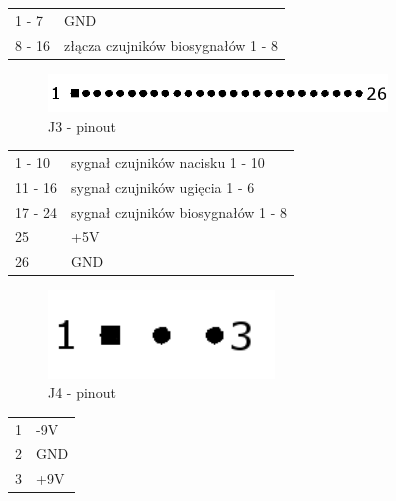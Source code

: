\documentclass{article}
\begin{document}
\begin{table}[H]
	\centering
	\label{J2 - pinout}
	\begin{tabular}{ll}
	1 - 7		&	GND					\\
	8 - 16		&	złącza czujników biosygnałów 1 - 8	\\
\end{tabular}
\end{table}

\begin{figure}[H]
	\centering
	\includegraphics[width=9cm]{J3.png}
	\caption{J3 - pinout}
	\label{rys:J3 - pinout}
\end{figure}

\begin{table}[H]
	\centering
	\label{J3 - pinout}
	\begin{tabular}{ll}
	1 - 10		&	sygnał czujników nacisku 1 - 10		\\
	11 - 16		&	sygnał czujników ugięcia 1 - 6		\\
	17 - 24		&	sygnał czujników biosygnałów 1 - 8	\\
	25		&	+5V					\\
	26		&	GND					\\
\end{tabular}
\end{table}

\begin{figure}[H]
	\centering
	\includegraphics[width=6cm]{J4.png}
	\caption{J4 - pinout}
	\label{rys:J4 - pinout}
\end{figure}

\begin{table}[H]
	\centering
	\label{J4 - pinout}
	\begin{tabular}{ll}
	1 		&	-9V					\\
	2		&	GND					\\
	3		&	+9V					\\
\end{tabular}
\end{table}
\end{document}
